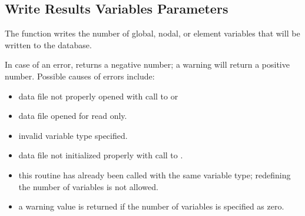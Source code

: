 \subsection{Write Results Variables Parameters}

The function  writes the number of global,
nodal, or element variables that will be written to the database.

In case of an error,  returns a negative
number; a warning will return a positive number. Possible causes of
errors include:

\begin{itemize}
 \item data file not properly opened with call to 
 or 

 \item data file opened for read only.

 \item invalid variable type specified.

 \item data file not initialized properly with call to .

 \item this routine has already been called with the same variable
 type; redefining the number of variables is not allowed.

 \item a warning value is returned if the number of variables
is specified as zero.
\end{itemize}


